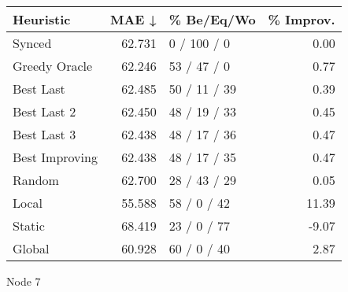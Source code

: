 \begin{tabular}{lrlr}
\toprule
\textbf{Heuristic} & \textbf{MAE ↓} & \textbf{\% Be/Eq/Wo} & \textbf{\% Improv.} \\
\midrule
            Synced &         62.731 &          0 / 100 / 0 &                0.00 \\
     Greedy Oracle &         62.246 &          53 / 47 / 0 &                0.77 \\
         Best Last &         62.485 &         50 / 11 / 39 &                0.39 \\
       Best Last 2 &         62.450 &         48 / 19 / 33 &                0.45 \\
       Best Last 3 &         62.438 &         48 / 17 / 36 &                0.47 \\
    Best Improving &         62.438 &         48 / 17 / 35 &                0.47 \\
            Random &         62.700 &         28 / 43 / 29 &                0.05 \\
             Local &         55.588 &          58 / 0 / 42 &               11.39 \\
            Static &         68.419 &          23 / 0 / 77 &               -9.07 \\
            Global &         60.928 &          60 / 0 / 40 &                2.87 \\
\bottomrule
\end{tabular}
\caption{Node 7}
\label{tab:non_lr01_le1_bs4_7}
